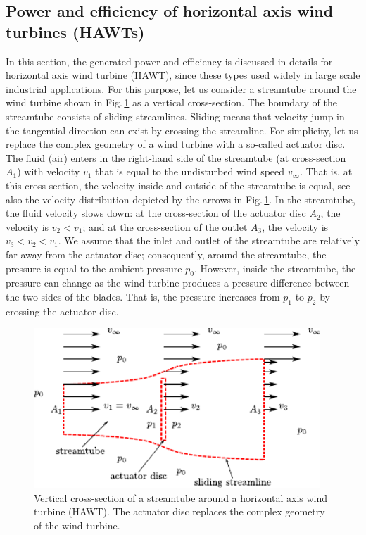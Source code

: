 \subsection{Power and efficiency of horizontal axis wind turbines (HAWTs)} \label{power_and_efficiency_of_HAWTs}
In this section, the generated power and efficiency is discussed in details for horizontal axis wind turbine (HAWT), since these types used widely in large scale industrial applications. For this purpose, let us consider a streamtube around the wind turbine shown in Fig.\,\ref{Fig:SteamTube_HAWT} as a vertical cross-section. The boundary of the streamtube consists of sliding streamlines. Sliding means that velocity jump in the tangential direction can exist by crossing the streamline. For simplicity, let us replace the complex geometry of a wind turbine with a so-called actuator disc. The fluid (air) enters in the right-hand side of the streamtube (at cross-section $A_1$) with velocity $v_1$ that is equal to the undisturbed wind speed $v_{\infty}$. That is, at this cross-section, the velocity inside and outside of the streamtube is equal, see also the velocity distribution depicted by the arrows in Fig.\,\ref{Fig:SteamTube_HAWT}. In the streamtube, the fluid velocity slows down: at the cross-section of the actuator disc $A_2$, the velocity is $v_2<v_1$; and at the cross-section of the outlet $A_3$, the velocity is $v_3<v_2<v_1$. We assume that the inlet and outlet of the streamtube are relatively far away from the actuator disc; consequently, around the streamtube, the pressure is equal to the ambient pressure $p_0$. However, inside the streamtube, the pressure can change as the wind turbine produces a pressure difference between the two sides of the blades. That is, the pressure increases from $p_1$ to $p_2$ by crossing the actuator disc.

\begin{figure}[ht!]
	\centering
		\includegraphics[height=6cm]{HydroAndWindPower/Figures/SteamTube_HAWT.pdf}
	\caption{Vertical cross-section of a streamtube around a horizontal axis wind turbine (HAWT). The actuator disc replaces the complex geometry of the wind turbine.}
	\label{Fig:SteamTube_HAWT}
\end{figure}

